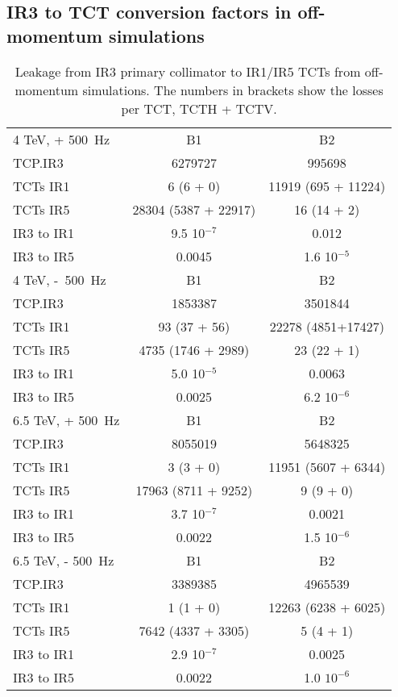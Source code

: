 \subsection{IR3 to TCT conversion factors in off-momentum simulations}
\begin{table}[!h]
   \centering
   \caption{Leakage from IR3 primary collimator to IR1/IR5 TCTs from off-momentum simulations. The numbers in brackets show the losses per TCT, TCTH + TCTV. }

   \begin{tabular}{l|c|c}
       \hline
       4 TeV, + 500~Hz  & B1 & B2\\
       TCP.IR3  & 6279727 & 995698  \\
       TCTs IR1 & 6 (6 + 0) & 11919 (695 + 11224) \\
       TCTs IR5 & 28304 (5387 + 22917) & 16 (14 + 2) \\
       IR3 to IR1 & 9.5 10$^{-7}$ & 0.012 \\
       IR3 to IR5 & 0.0045 & 1.6 10$^{-5}$ \\
       \hline
       4 TeV, -~500~Hz  & B1 & B2\\
       TCP.IR3  & 1853387 & 3501844 \\
       TCTs IR1  & 93 (37 + 56) & 22278 (4851+17427) \\
       TCTs IR5  &  4735 (1746 + 2989) & 23 (22 + 1) \\
       IR3 to IR1 & 5.0 10$^{-5}$ & 0.0063 \\
       IR3 to IR5 & 0.0025 & 6.2 10$^{-6}$ \\
       \hline

       6.5 TeV, + 500~Hz  & B1 & B2\\
       TCP.IR3  & 8055019 & 5648325  \\
       TCTs IR1 & 3 (3 + 0) & 11951 (5607 + 6344) \\
       TCTs IR5 & 17963 (8711 + 9252) & 9 (9 + 0)\\
       IR3 to IR1 & 3.7 10$^{-7}$ & 0.0021 \\
       IR3 to IR5 & 0.0022 & 1.5 10$^{-6}$ \\
       \hline
       6.5 TeV, - 500~Hz  & B1 & B2\\
       TCP.IR3  &  3389385 &  4965539 \\
       TCTs IR1  &  1 (1 + 0) &  12263 (6238 + 6025) \\
       TCTs IR5  &  7642 (4337 + 3305) &  5 (4 + 1)\\
       IR3 to IR1 &  2.9 10$^{-7}$ & 0.0025 \\
       IR3 to IR5 &  0.0022 &  1.0 $10^{-6}$ \\
       \hline

   \end{tabular}
   \label{tab:IR3leakageFactors}
\end{table}

